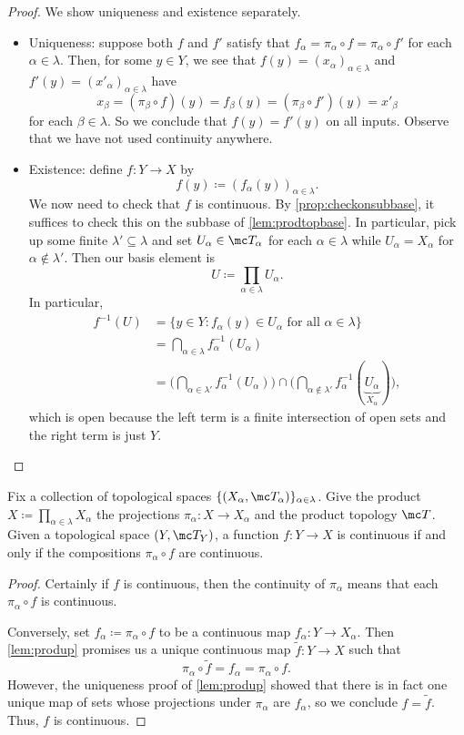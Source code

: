 \documentclass[../notes.tex]{subfiles}
\begin{document}
\begin{proof}
	We show uniqueness and existence separately.
	\begin{itemize}
		\item Uniqueness: suppose both $f$ and $f'$ satisfy that $f_\alpha=\pi_\alpha\circ f=\pi_\alpha\circ f'$ for each $\alpha\in\lambda$. Then, for some $y\in Y$, we see that $f(y)=(x_\alpha)_{\alpha\in\lambda}$ and $f'(y)=(x'_\alpha)_{\alpha\in\lambda}$ have
		\[x_\beta=(\pi_\beta\circ f)(y)=f_\beta(y)=(\pi_\beta\circ f')(y)=x'_\beta\]
		for each $\beta\in\lambda$. So we conclude that $f(y)=f'(y)$ on all inputs. Observe that we have not used continuity anywhere.
		\item Existence: define $f\colon Y\to X$ by
		\[f(y)\coloneqq(f_\alpha(y))_{\alpha\in\lambda}.\]
		We now need to check that $f$ is continuous. By \autoref{prop:checkonsubbase}, it suffices to check this on the subbase of \autoref{lem:prodtopbase}. In particular, pick up some finite $\lambda'\subseteq\lambda$ and set $U_\alpha\in\mc T_\alpha$ for each $\alpha\in\lambda$ while $U_\alpha=X_\alpha$ for $\alpha\notin\lambda'$. Then our basis element is
		\[U\coloneqq\prod_{\alpha\in\lambda}U_\alpha.\]
		In particular,
		\begin{align*}
			f^{-1}(U) &= \{y\in Y:f_\alpha(y)\in U_\alpha\text{ for all }\alpha\in\lambda\} \\
			&= \bigcap_{\alpha\in\lambda}f_\alpha^{-1}(U_\alpha) \\
			&= \Bigg(\bigcap_{\alpha\in\lambda'}f_\alpha^{-1}(U_\alpha)\Bigg)\cap\Bigg(\bigcap_{\alpha\notin\lambda'}f_\alpha^{-1}(\underbrace{U_\alpha}_{X_\alpha})\Bigg),
		\end{align*}
		which is open because the left term is a finite intersection of open sets and the right term is just $Y$.
		\qedhere
	\end{itemize}
\end{proof}
\begin{corollary}
	Fix a collection of topological spaces $\{(X_\alpha,\mc T_\alpha)\}_{\alpha\in\lambda}$. Give the product $X\coloneqq\prod_{\alpha\in\lambda}X_\alpha$ the projections $\pi_\alpha\colon X\to X_\alpha$ and the product topology $\mc T$. Given a topological space $(Y,\mc T_Y)$, a function $f\colon Y\to X$ is continuous if and only if the compositions $\pi_\alpha\circ f$ are continuous.
\end{corollary}
\begin{proof}
	Certainly if $f$ is continuous, then the continuity of $\pi_\alpha$ means that each $\pi_\alpha\circ f$ is continuous.

	Conversely, set $f_\alpha\coloneqq\pi_\alpha\circ f$ to be a continuous map $f_\alpha\colon Y\to X_\alpha$. Then \autoref{lem:produp} promises us a unique continuous map $\widetilde f\colon Y\to X$ such that
	\[\pi_\alpha\circ\widetilde f=f_\alpha=\pi_\alpha\circ f.\]
	However, the uniqueness proof of \autoref{lem:produp} showed that there is in fact one unique map of sets whose projections under $\pi_\alpha$ are $f_\alpha$, so we conclude $f=\widetilde f$. Thus, $f$ is continuous.
\end{proof}
\end{document}
